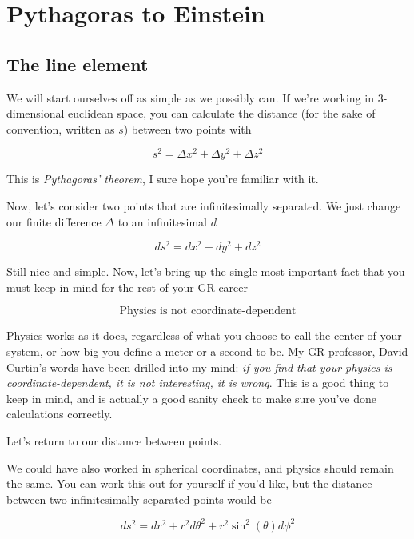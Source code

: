 \documentclass{article}
\begin{document}
\section{Pythagoras to Einstein}
\subsection{The line element}
We will start ourselves off as simple as we possibly can. If we're working in 3-dimensional euclidean space, you can calculate the distance (for the sake of convention, written as $s$) between two points with

\begin{equation}
    s^2 = \Delta x^2 + \Delta y^2 + \Delta z^2
\end{equation}

This is \textit{Pythagoras' theorem}, I sure hope you're familiar with it.

Now, let's consider two points that are infinitesimally separated. We just change our finite difference $\Delta$ to an infinitesimal $d$

\begin{equation}
    ds^2 = dx^2 + dy^2 + dz^2 \label{eq:dseuc}
\end{equation}

Still nice and simple. Now, let's bring up the single most important fact that you must keep in mind for the rest of your GR career

\begin{equation}
    \boxed{\text{Physics is not coordinate-dependent}}
\end{equation}

Physics works as it does, regardless of what you choose to call the center of your system, or how big you define a meter or a second to be. My GR professor, David Curtin's words have been drilled into my mind: \textit{if you find that your physics is coordinate-dependent, it is not interesting, it is wrong}. This is a good thing to keep in mind, and is actually a good sanity check to make sure you've done calculations correctly.

Let's return to our distance between points.

We could have also worked in spherical coordinates, and physics should remain the same. You can work this out for yourself if you'd like, but the distance between two infinitesimally separated points would be

\begin{equation}
    ds^2 = dr^2 + r^2d\theta^2 + r^2\sin^2(\theta)d\phi^2 \label{eq:dssphere}
\end{equation}
\end{document}
